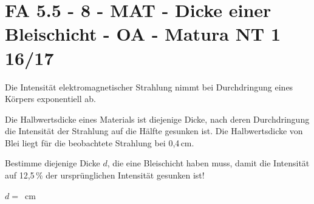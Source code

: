 \section{FA 5.5 - 8 - MAT - Dicke einer Bleischicht - OA - Matura NT 1 16/17}

\begin{beispiel}[FA 5.5]{1} %
Die Intensität elektromagnetischer Strahlung nimmt bei Durchdringung eines Körpers exponentiell ab.

Die Halbwertsdicke eines Materials ist diejenige Dicke, nach deren Durchdringung die Intensität der Strahlung auf die Hälfte gesunken ist. Die Halbwertsdicke von Blei liegt für die beobachtete Strahlung bei 0,4\,cm.

Bestimme diejenige Dicke $d$, die eine Bleischicht haben muss, damit die Intensität auf 12,5\,\% der ursprünglichen Intensität gesunken ist!\leer

$d=$ \,cm
\end{beispiel}